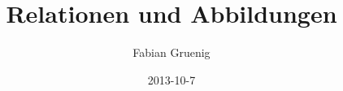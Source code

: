 


\providecommand\onetwostyle{oneside}










\title{Relationen und Abbildungen}
\author{Fabian Gruenig}
\date{2013-10-7}

\pagestyle{fancy}

  \fancyhead{} %
  \fancyhead[L]{\nouppercase{\slshape \leftmark}}
  \fancyhead[R]{}

  \fancyfoot{} %
  \fancyfoot[C]{\small{\thepage}}

  \renewcommand{\headrulewidth}{0.4pt}
  \renewcommand{\footrulewidth}{0.4pt}

\raggedbottom










\newpage

\newpage

\newpage


\newpage




